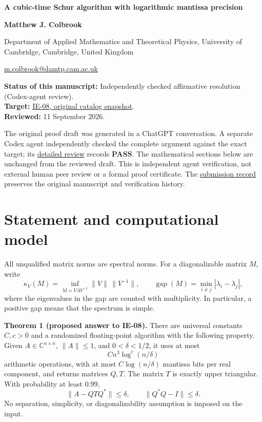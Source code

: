 \documentclass[10pt,a4paper]{article}
\begin{document}
{\raggedright\Large\bfseries A cubic-time Schur algorithm with
logarithmic mantissa precision\par}
\vspace{0.4em}
{\normalsize\bfseries Matthew J. Colbrook\par}
{\small Department of Applied Mathematics and Theoretical Physics,
University of Cambridge, Cambridge, United Kingdom\par}
{\small\href{mailto:m.colbrook@damtp.cam.ac.uk}{m.colbrook@damtp.cam.ac.uk}\par}
\vspace{0.6em}
\textbf{Status of this manuscript:} Independently checked affirmative
resolution (Codex-agent review).\\
\textbf{Target:}
\href{https://github.com/ajt60gaibb/OpenProblemsInNLA/blob/b4123194697bdf6f8f82518c1dd7d6c40a30c2e0/eigenvalues-and-inverse-problems/IE-08/README.md}{IE-08,
original catalog snapshot}.\\
\textbf{Reviewed:} 11 September 2026.

The original proof draft was generated in a ChatGPT conversation. A
separate Codex agent independently checked the complete argument against
the exact target; its
\href{https://github.com/ajt60gaibb/OpenProblemsInNLA/blob/main/references/colbrook-additional-2026-09-11/verification/reviews/IE-08-review.md}{detailed
review} records \textbf{PASS}. The mathematical sections below are
unchanged from the reviewed draft. This is independent agent
verification, not external human peer review or a formal proof
certificate. The
\href{https://github.com/ajt60gaibb/OpenProblemsInNLA/blob/main/references/colbrook-additional-2026-09-11/README.md}{submission
record} preserves the original manuscript and verification history.

\section{Statement and computational
model}\label{statement-and-computational-model}

All unqualified matrix norms are spectral norms. For a diagonalizable
matrix \(M\), write \[
 \kappa_V(M)=\inf_{M=V\Lambda V^{-1}}\|V\|\,\|V^{-1}\|,
 \qquad
 \operatorname{gap}(M)=\min_{i\ne j}|\lambda_i-\lambda_j|,
\] where the eigenvalues in the gap are counted with multiplicity. In
particular, a positive gap means that the spectrum is simple.

\textbf{Theorem 1 (proposed answer to IE-08).} There are universal
constants \(C,c>0\) and a randomized floating-point algorithm with the
following property. Given \(A\in\mathbb C^{n\times n}\), \(\|A\|\le1\),
and \(0<\delta<1/2\), it uses at most \[
 Cn^3\log^c(n/\delta)
\] arithmetic operations, with at most \(C\log(n/\delta)\) mantissa bits
per real component, and returns matrices \(Q,T\). The matrix \(T\) is
exactly upper triangular. With probability at least \(0.99\), \[
 \|A-QTQ^*\|\le\delta,
 \qquad \|Q^*Q-I\|\le\delta.
\] No separation, simplicity, or diagonalizability assumption is imposed
on the input.
\end{document}
